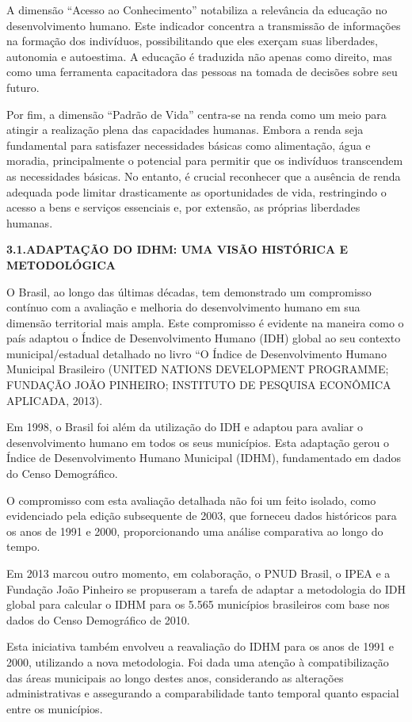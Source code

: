 \documentclass[
]{article}
\begin{document}
A dimensão ``Acesso ao Conhecimento'' notabiliza a relevância da
educação no desenvolvimento humano. Este indicador concentra a
transmissão de informações na formação dos indivíduos, possibilitando
que eles exerçam suas liberdades, autonomia e autoestima. A educação é
traduzida não apenas como direito, mas como uma ferramenta capacitadora
das pessoas na tomada de decisões sobre seu futuro.

Por fim, a dimensão ``Padrão de Vida'' centra-se na renda como um meio
para atingir a realização plena das capacidades humanas. Embora a renda
seja fundamental para satisfazer necessidades básicas como alimentação,
água e moradia, principalmente o potencial para permitir que os
indivíduos transcendem as necessidades básicas. No entanto, é crucial
reconhecer que a ausência de renda adequada pode limitar drasticamente
as oportunidades de vida, restringindo o acesso a bens e serviços
essenciais e, por extensão, as próprias liberdades humanas.

\textbf{3.1.ADAPTAÇÃO DO IDHM: UMA VISÃO HISTÓRICA E METODOLÓGICA}

O Brasil, ao longo das últimas décadas, tem demonstrado um compromisso
contínuo com a avaliação e melhoria do desenvolvimento humano em sua
dimensão territorial mais ampla. Este compromisso é evidente na maneira
como o país adaptou o Índice de Desenvolvimento Humano (IDH) global ao
seu contexto municipal/estadual detalhado no livro ``O Índice de
Desenvolvimento Humano Municipal Brasileiro (UNITED NATIONS DEVELOPMENT
PROGRAMME; FUNDAÇÃO JOÃO PINHEIRO; INSTITUTO DE PESQUISA ECONÔMICA
APLICADA, 2013).

Em 1998, o Brasil foi além da utilização do IDH e adaptou para avaliar o
desenvolvimento humano em todos os seus municípios. Esta adaptação gerou
o Índice de Desenvolvimento Humano Municipal (IDHM), fundamentado em
dados do Censo Demográfico.

O compromisso com esta avaliação detalhada não foi um feito isolado,
como evidenciado pela edição subsequente de 2003, que forneceu dados
históricos para os anos de 1991 e 2000, proporcionando uma análise
comparativa ao longo do tempo.

Em 2013 marcou outro momento, em colaboração, o PNUD Brasil, o IPEA e a
Fundação João Pinheiro se propuseram a tarefa de adaptar a metodologia
do IDH global para calcular o IDHM para os 5.565 municípios brasileiros
com base nos dados do Censo Demográfico de 2010.

Esta iniciativa também envolveu a reavaliação do IDHM para os anos de
1991 e 2000, utilizando a nova metodologia. Foi dada uma atenção à
compatibilização das áreas municipais ao longo destes anos, considerando
as alterações administrativas e assegurando a comparabilidade tanto
temporal quanto espacial entre os municípios.
\end{document}
